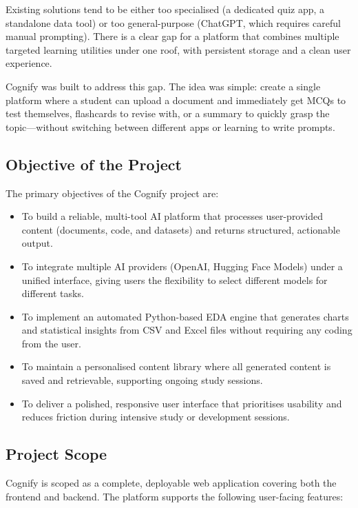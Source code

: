\documentclass[12pt,a4paper]{article}
\begin{document}
Existing solutions tend to be either too specialised (a dedicated quiz app, a standalone data tool) or too general-purpose (ChatGPT, which requires careful manual prompting). There is a clear gap for a platform that combines multiple targeted learning utilities under one roof, with persistent storage and a clean user experience.

Cognify was built to address this gap. The idea was simple: create a single platform where a student can upload a document and immediately get MCQs to test themselves, flashcards to revise with, or a summary to quickly grasp the topic—without switching between different apps or learning to write prompts.

\subsection{Objective of the Project}

The primary objectives of the Cognify project are:

\begin{itemize}
    \item To build a reliable, multi-tool AI platform that processes user-provided content (documents, code, and datasets) and returns structured, actionable output.
    \item To integrate multiple AI providers (OpenAI, Hugging Face Models) under a unified interface, giving users the flexibility to select different models for different tasks.
    \item To implement an automated Python-based EDA engine that generates charts and statistical insights from CSV and Excel files without requiring any coding from the user.
    \item To maintain a personalised content library where all generated content is saved and retrievable, supporting ongoing study sessions.
    \item To deliver a polished, responsive user interface that prioritises usability and reduces friction during intensive study or development sessions.
\end{itemize}

\subsection{Project Scope}

Cognify is scoped as a complete, deployable web application covering both the frontend and backend. The platform supports the following user-facing features:
\end{document}
